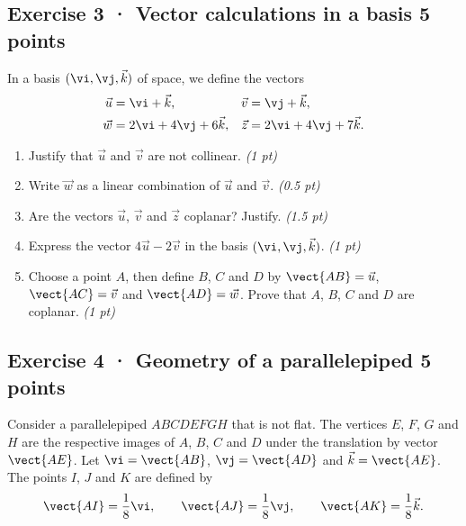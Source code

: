 \mxnewpage{}

\subsection*{Exercise 3 · Vector calculations in a basis \hfill 5 points}In a basis $(\vi,\vj,\vec k)$ of space, we define the vectors
\[\begin{aligned}\vec u&=\vi+\vec k,&\vec v&=\vj+\vec k,\\
\vec w&=2\vi+4\vj+6\vec k,&\vec z&=2\vi+4\vj+7\vec k.\end{aligned}\]

\begin{enumerate}

\item Justify that $\vec u$ and $\vec v$ are not collinear. \hfill\textit{(1 pt)}

\item Write $\vec w$ as a linear combination of $\vec u$ and $\vec v$. \hfill\textit{(0.5 pt)}

\item Are the vectors $\vec u$, $\vec v$ and $\vec z$ coplanar? Justify. \hfill\textit{(1.5 pt)}

\item Express the vector $4\vec u-2\vec v$ in the basis $(\vi,\vj,\vec k)$. \hfill\textit{(1 pt)}

\item Choose a point $A$, then define $B$, $C$ and $D$ by $\vect{AB}=\vec u$, $\vect{AC}=\vec v$ and $\vect{AD}=\vec w$. Prove that $A$, $B$, $C$ and $D$ are coplanar. \hfill\textit{(1 pt)}

\end{enumerate}

\subsection*{Exercise 4 · Geometry of a parallelepiped \hfill 5 points}Consider a parallelepiped $ABCDEFGH$ that is not flat. The vertices $E$, $F$, $G$ and $H$ are the respective images of $A$, $B$, $C$ and $D$ under the translation by vector $\vect{AE}$.
Let $\vi=\vect{AB}$, $\vj=\vect{AD}$ and $\vec k=\vect{AE}$.
The points $I$, $J$ and $K$ are defined by
\[\vect{AI}=\frac1{8}\vi,\qquad\vect{AJ}=\frac1{8}\vj,\qquad\vect{AK}=\frac1{8}\vec k.\]

